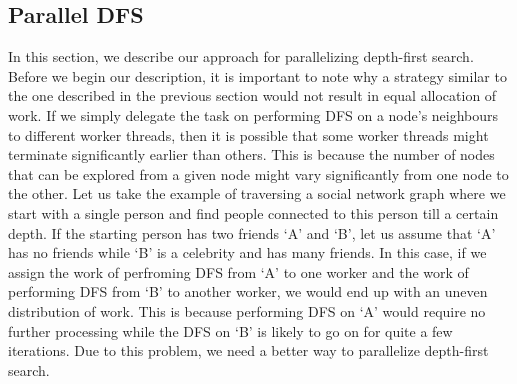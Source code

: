 \subsection{Parallel DFS}
In this section, we describe our approach for parallelizing depth-first search.
Before we begin our description, it is important to note why a strategy similar
to the one described in the previous section would not result in equal
allocation of work. If we simply delegate the task on performing DFS on a node's
neighbours to different worker threads, then it is possible that some worker
threads might terminate significantly earlier than others. This is because the
number of nodes that can be explored from a given node might vary significantly
from one node to the other. Let us take the example of traversing a social
network graph where we start with a single person and find people connected to
this person till a certain depth. If the starting person has two friends `A' and
`B', let us assume that `A' has no friends while `B' is a celebrity and has many
friends. In this case, if we assign the work of perfroming DFS from `A' to one
worker and the work of performing DFS from `B' to another worker, we would end
up with an uneven distribution of work. This is because performing DFS on `A'
would require no further processing while the DFS on `B' is likely to go on for
quite a few iterations. Due to this problem, we need a better way to parallelize
depth-first search.

